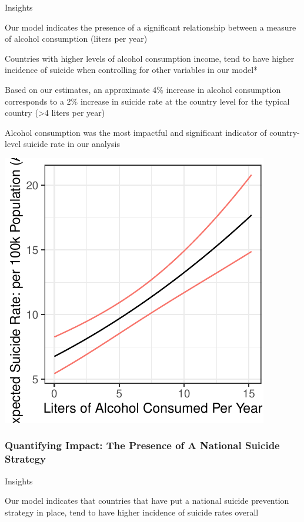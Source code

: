 \documentclass[]{article}
\begin{document}
Insights

Our model indicates the presence of a significant relationship between a
measure of alcohol consumption (liters per year)

Countries with higher levels of alcohol consumption income, tend to have
higher incidence of suicide when controlling for other variables in our
model*

Based on our estimates, an approximate 4\% increase in alcohol
consumption corresponds to a 2\% increase in suicide rate at the country
level for the typical country (\textgreater{}4 liters per year)

Alcohol consumption was the most impactful and significant indicator of
country-level suicide rate in our analysis

\begin{center}\includegraphics{Project_Report_files/figure-latex/a_alc_plot-1} \end{center}

\subsubsection{Quantifying Impact: The Presence of A National Suicide
Strategy}\label{quantifying-impact-the-presence-of-a-national-suicide-strategy}

Insights

Our model indicates that countries that have put a national suicide
prevention strategy in place, tend to have higher incidence of suicide
rates overall
\end{document}
